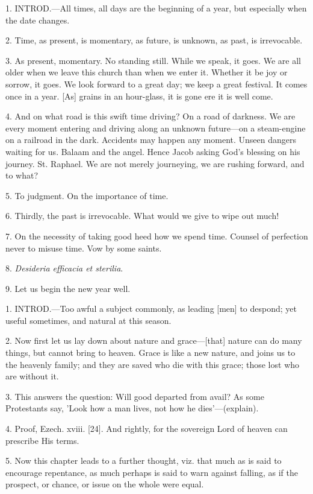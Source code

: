 1. INTROD.—All
times, all days are the beginning of a year, but especially when the
date changes.

2. Time, as present, is momentary, as future, is
unknown, as past, is irrevocable.

3. As present, momentary. No standing still.
While we speak, it goes. We are all older when we leave this church
than when we enter it. Whether it be joy or sorrow, it goes. We look
forward to a great day; we keep a great festival. It comes once in a
year. [As] grains in an hour-glass, it is gone ere it is well come.

4. And on what road is this swift time driving?
On a road of darkness. We are every moment entering and driving along
an unknown future—on a steam-engine on a railroad in the dark.
Accidents may happen any moment. Unseen dangers waiting for us. Balaam
and the angel. Hence Jacob asking God's blessing on his journey. St.
Raphael. We are not merely journeying, we are rushing forward, and to
what?

5. To judgment. On the importance of time.

6. Thirdly, the past is irrevocable. What would
we give to wipe out much!

7. On the necessity of taking good heed how we
spend time. Counsel of perfection never to misuse time. Vow by some
saints.

8. \emph{Desideria efficacia et sterilia}.

9. Let us begin the new year well.


1. INTROD.—Too
awful a subject commonly, as leading [men] to despond; yet useful
sometimes, and natural at this season.

2. Now first let us lay down about nature and
grace—[that] nature can do many things, but cannot bring to heaven.
Grace is like a new nature, and joins us to the heavenly family; and
they are saved who die with this grace; those lost who are without it.

3. This answers the question: Will good departed
from avail? As some Protestants say, 'Look how a man lives, not how he
dies'—(explain).

4. Proof, Ezech. xviii. [24]. And rightly, for
the sovereign Lord of heaven can prescribe His terms.

5. Now this chapter leads to a further thought,
viz. that much as is said to encourage repentance, as much perhaps is
said to warn against falling, as if the prospect, or chance, or issue
on the whole were equal.

